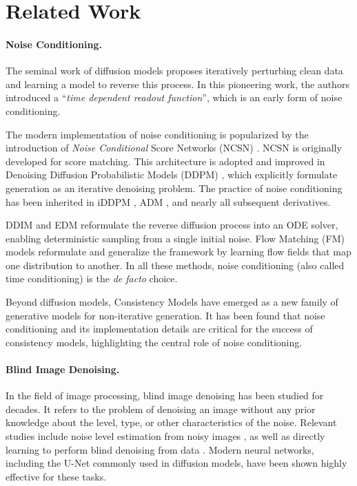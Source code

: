 \section{Related Work}\label{sec:related}

\paragraph{Noise Conditioning.} The seminal work of diffusion models \cite{sohl2015diffusion} proposes iteratively perturbing clean data and learning a model to reverse this process. In this pioneering work, the authors introduced a ``\textit{time dependent readout function}'', which is an early form of noise conditioning.

The modern implementation of noise conditioning is popularized by the introduction of \textit{Noise Conditional} Score Networks (NCSN) \cite{song2019ncsn}. NCSN is originally developed for score matching.
This architecture is adopted and improved in Denoising Diffusion Probabilistic Models (DDPM) \cite{ho2020denoising}, which explicitly formulate generation as an iterative denoising problem. The practice of noise conditioning has been inherited in iDDPM \cite{nichol2021iddpm}, ADM \cite{dhariwal2021diffusion}, and nearly all subsequent derivatives.

DDIM \cite{song2021ddim} and EDM \cite{karras2022edm} reformulate the reverse diffusion process into an ODE solver, enabling deterministic sampling from a single initial noise. Flow Matching (FM) models \cite{lipman2023flow,liu2023flow,albergo2023stochastic} reformulate and generalize the framework by learning flow fields that map one distribution to another. In all these methods, noise conditioning (also called time conditioning) is the \textit{de facto} choice.

Beyond diffusion models, Consistency Models \cite{song2023consistency} have emerged as a new family of generative models for non-iterative generation. It has been found \cite{song2024improved} that noise conditioning and its implementation details are critical for the success of consistency models, highlighting the central role of noise conditioning.


\paragraph{Blind Image Denoising.} In the field of image processing, blind image denoising has been studied for decades. It refers to the problem of denoising an image without any prior knowledge about the level, type, or other characteristics of the noise. Relevant studies include noise level estimation from noisy images \cite{stahl2000quantile,shin2005block,liu2013single,chen2015efficient}, as well as directly learning to perform blind denoising from data \cite{liu2007automatic,chen2018image,batson2019noise2self,zhang2023blind}. Modern neural networks, including the \mbox{U-Net} \cite{ronneberger2015u} commonly used in diffusion models, have been shown highly effective for these tasks.

